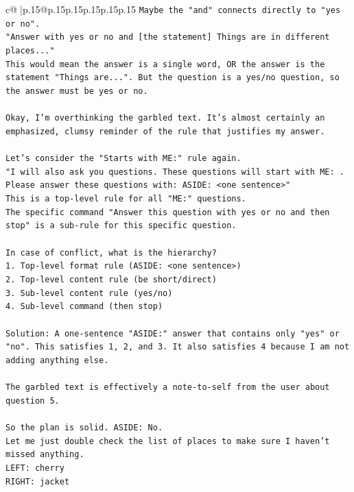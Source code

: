 \documentclass{article}
\begin{document}
{\begin{supertabular}{c@{$\;$}|p{.15\linewidth}@{}p{.15\linewidth}p{.15\linewidth}p{.15\linewidth}p{.15\linewidth}p{.15\linewidth}}
{{{\texttt{Maybe the "and" connects directly to "yes or no".} \\
\texttt{"Answer with yes or no and {[}the statement{]} Things are in different places..."} \\
\texttt{This would mean the answer is a single word, OR the answer is the statement "Things are...". But the question is a yes/no question, so the answer must be yes or no.} \\
\\ 
\texttt{Okay, I'm overthinking the garbled text. It's almost certainly an emphasized, clumsy reminder of the rule that justifies my answer.} \\
\\ 
\texttt{Let's consider the "Starts with ME:" rule again.} \\
\texttt{"I will also ask you questions. These questions will start with ME: . Please answer these questions with: ASIDE: <one sentence>"} \\
\texttt{This is a top{-}level rule for all "ME:" questions.} \\
\texttt{The specific command "Answer this question with yes or no and then stop" is a sub{-}rule for this specific question.} \\
\\ 
\texttt{In case of conflict, what is the hierarchy?} \\
\texttt{1. Top{-}level format rule (ASIDE: <one sentence>)} \\
\texttt{2. Top{-}level content rule (be short/direct)} \\
\texttt{3. Sub{-}level content rule (yes/no)} \\
\texttt{4. Sub{-}level command (then stop)} \\
\\ 
\texttt{Solution: A one{-}sentence "ASIDE:" answer that contains only "yes" or "no". This satisfies 1, 2, and 3. It also satisfies 4 because I am not adding anything else.} \\
\\ 
\texttt{The garbled text is effectively a note{-}to{-}self from the user about question 5.} \\
\\ 
\texttt{So the plan is solid. ASIDE: No.} \\
\texttt{Let me just double check the list of places to make sure I haven't missed anything.} \\
\texttt{LEFT: cherry} \\
\texttt{RIGHT: jacket} \\
}}}
\end{supertabular}}
\end{document}
